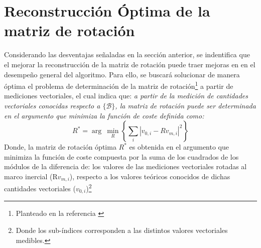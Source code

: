 \documentclass[conference]{IEEEtran}
\newcommand{\marco}[1]{\{\mathcal{#1}\}}
\begin{document}
\section{Reconstrucción Óptima de la matriz de rotación}
Considerando las desventajas señaladas en la sección anterior, se indentifica que el mejorar la reconstrucción de la matriz de rotación puede traer mejoras en en el desempeño general del algoritmo. Para ello, se buscará solucionar de manera óptima el problema de determinación de la matriz de rotación\footnote{Planteado en la referencia \cite{Mahony2008}} a partir de mediciones vectoriales, el cual indica que: \emph{a partir de la medición de cantidades vectoriales conocidas respecto a $\marco{B}$, la matriz de rotación puede ser determinada en el argumento que minimiza la función de coste definida como:}
\begin{equation}\label{ProblemaOptimizacion}
R^*=\arg~\min_{R}\left\{\sum_i|v_{0,i}-Rv_{m,i}|^2\right\}
\end{equation}
Donde, la matriz de rotación óptima $R^*$ es obtenida en el argumento que minimiza la función de coste compuesta por la suma de los cuadrados de los módulos de la diferencia de: los valores de las mediciones vectoriales rotadas al marco inercial (R$v_{m,i}$), respecto a los valores teóricos conocidos de dichas cantidades vectoriales ($v_{0,i}$)\footnote{Donde los sub-índices corresponden a las distintos valores vectoriales medibles.}
\end{document}
